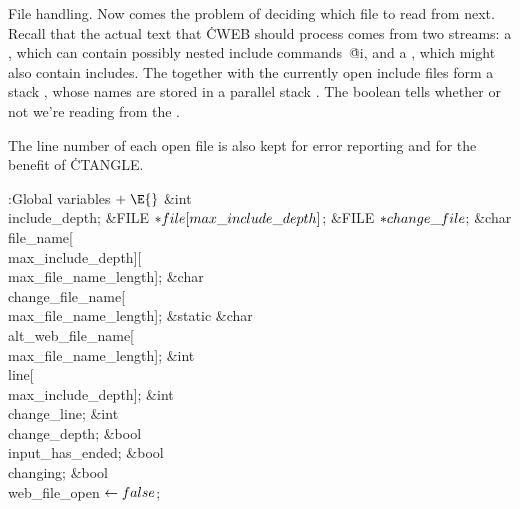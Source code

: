 File handling. Now comes the problem of deciding which file to read
from
next.  Recall that the actual text that \.{CWEB} should process comes from two
streams: a , which can contain possibly nested include
commands~\.{@i}, and a , which might also contain
includes.  The  together with the currently open include
files form a stack , whose names are stored in a parallel stack
.  The boolean  tells whether or not we're
reading
from the .

The line number of each open file is also kept for error reporting and
for the benefit of \.{CTANGLE}.

\Y\B\4:Global variables\X${}\mathrel+\E{}$\6
\&{int} \\{include\_depth};\6
\&{FILE} ${}{*}\\{file}[\\{max\_include\_depth}]{}$;\6
\&{FILE} ${}{*}\\{change\_file}{}$;\6
\&{char} \\{file\_name}[\\{max\_include\_depth}][\\{max\_file\_name\_length}];%
\6
\&{char} \\{change\_file\_name}[\\{max\_file\_name\_length}];\6
\&{static} \&{char} \\{alt\_web\_file\_name}[\\{max\_file\_name\_length}];\6
\&{int} \\{line}[\\{max\_include\_depth}];\6
\&{int} \\{change\_line};\6
\&{int} \\{change\_depth};\6
\&{bool} \\{input\_has\_ended};\6
\&{bool} \\{changing};\6
\&{bool} \\{web\_file\_open}${}\leftarrow\\{false}{}$;\par
\fi

